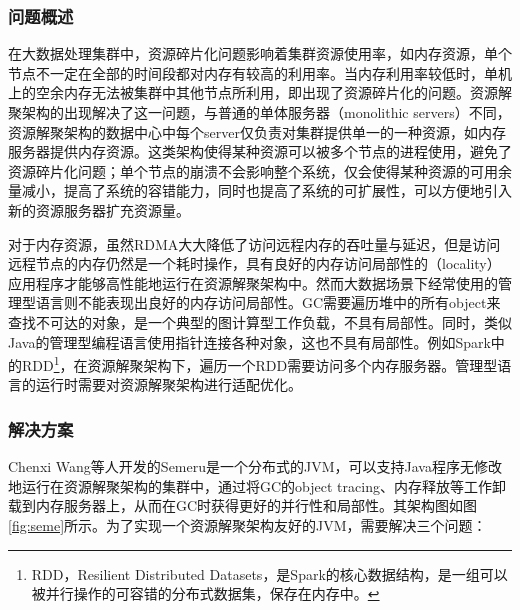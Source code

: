 \documentclass[lang=cn,12pt,a4paper,cite=authoryear]{elegantpaper}
\begin{document}
\subsubsection{问题概述}
在大数据处理集群中，资源碎片化问题影响着集群资源使用率，如内存资源，单个节点不一定在全部的时间段都对内存有较高的利用率。当内存利用率较低时，单机上的空余内存无法被集群中其他节点所利用，即出现了资源碎片化的问题。资源解聚架构的出现解决了这一问题，与普通的单体服务器（monolithic servers）不同，资源解聚架构的数据中心中每个server仅负责对集群提供单一的一种资源，如内存服务器提供内存资源。这类架构使得某种资源可以被多个节点的进程使用，避免了资源碎片化问题；单个节点的崩溃不会影响整个系统，仅会使得某种资源的可用余量减小，提高了系统的容错能力，同时也提高了系统的可扩展性，可以方便地引入新的资源服务器扩充资源量。

对于内存资源，虽然RDMA大大降低了访问远程内存的吞吐量与延迟，但是访问远程节点的内存仍然是一个耗时操作，具有良好的内存访问局部性的（locality）应用程序才能够高性能地运行在资源解聚架构中。然而大数据场景下经常使用的管理型语言则不能表现出良好的内存访问局部性。GC需要遍历堆中的所有object来查找不可达的对象，是一个典型的图计算型工作负载，不具有局部性。同时，类似Java的管理型编程语言使用指针连接各种对象，这也不具有局部性。例如Spark中的RDD\footnote{RDD，Resilient Distributed Datasets\cite{DBLP:conf/nsdi/ZahariaCDDMMFSS12}，是Spark的核心数据结构，是一组可以被并行操作的可容错的分布式数据集，保存在内存中。}，在资源解聚架构下，遍历一个RDD需要访问多个内存服务器。管理型语言的运行时需要对资源解聚架构进行适配优化。

\subsubsection{解决方案}
Chenxi Wang等人开发的Semeru\cite{semeru}是一个分布式的JVM，可以支持Java程序无修改地运行在资源解聚架构的集群中，通过将GC的object tracing、内存释放等工作卸载到内存服务器上，从而在GC时获得更好的并行性和局部性。其架构图如图\ref{fig:seme}所示。为了实现一个资源解聚架构友好的JVM，需要解决三个问题：
\end{document}

